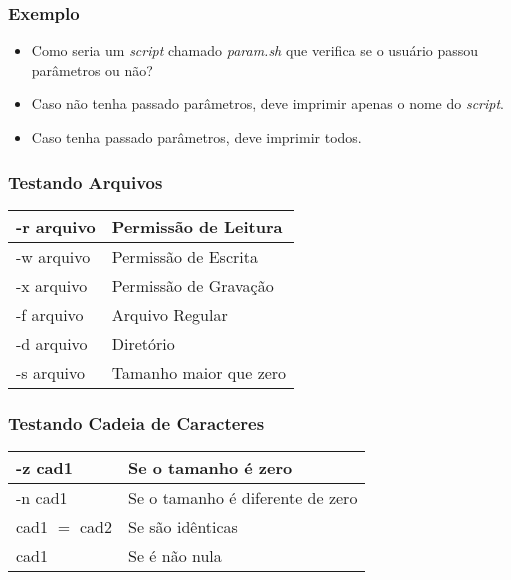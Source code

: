 \documentclass{beamer}
\begin{document}
   \begin{frame}
      \frametitle{Exemplo}
      \begin{itemize}
         \item Como seria um \textit{script} chamado \textit{param.sh} que verifica se o usuário passou parâmetros ou não?
         \item Caso não tenha passado parâmetros, deve imprimir apenas o nome do \textit{script}.
         \item Caso tenha passado parâmetros, deve imprimir todos.
      \end{itemize}
   \end{frame}

   \begin{frame}
      \frametitle{Testando Arquivos}
      \begin{table}
         \begin{tabular}{l|l}
	 \hline
         -r arquivo & Permissão de Leitura \\
         \hline 
         -w arquivo & Permissão de Escrita \\
         \hline 
         -x arquivo & Permissão de Gravação \\
         \hline 
         -f arquivo & Arquivo Regular \\
         \hline 
         -d arquivo & Diretório \\
         \hline 
         -s arquivo & Tamanho maior que zero \\
         \hline 
         \end{tabular}
      \end{table}
   \end{frame}
 
   \begin{frame}
      \frametitle{Testando Cadeia de Caracteres}
      \begin{table}
         \begin{tabular}{l|l}
	 \hline
         -z cad1 & Se o tamanho é zero \\
         \hline 
         -n cad1 & Se o tamanho é diferente de zero \\
         \hline 
         cad1 $=$ cad2 & Se são idênticas \\
         \hline 
	 cad1 & Se é não nula \\
	 \hline
         \end{tabular}
      \end{table}
   \end{frame}
\end{document}
